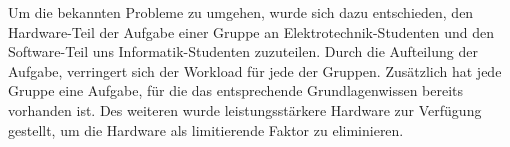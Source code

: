 \begin{enumerate}
    Um die bekannten Probleme zu umgehen, wurde sich dazu entschieden, den Hardware-Teil der Aufgabe einer Gruppe an Elektrotechnik-Studenten und den Software-Teil uns Informatik-Studenten zuzuteilen.
    Durch die Aufteilung der Aufgabe, verringert sich der Workload für jede der Gruppen. 
    Zusätzlich hat jede Gruppe eine Aufgabe, für die das entsprechende Grundlagenwissen bereits vorhanden ist.
    Des weiteren wurde leistungsstärkere Hardware zur Verfügung gestellt, um die Hardware als limitierende Faktor zu eliminieren.

\end{enumerate}

\newpage

